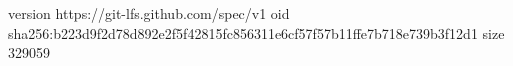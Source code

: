 version https://git-lfs.github.com/spec/v1
oid sha256:b223d9f2d78d892e2f5f42815fc856311e6cf57f57b11ffe7b718e739b3f12d1
size 329059
